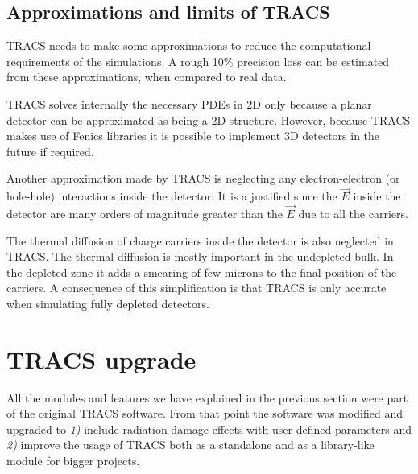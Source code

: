 \subsection{Approximations and limits of TRACS} %
\label{sec:approxTRACS}

TRACS needs to make some approximations to reduce the computational requirements of the simulations. A rough 10\% precision loss can be estimated from these approximations, when compared to real data. %
 
TRACS solves internally the necessary PDEs in 2D only because a planar detector can be approximated as being a 2D structure. However, because TRACS makes use of Fenics libraries it is possible to implement 3D detectors in the future if required.

Another approximation made by TRACS is neglecting any electron-electron (or hole-hole) interactions inside the detector. It is a justified since the $\overrightarrow E$ inside the detector are many orders of magnitude greater than the $\overrightarrow E$ due to all the carriers.

The thermal diffusion of charge carriers inside the detector is also neglected in TRACS. The thermal diffusion is mostly important in the undepleted bulk. In the depleted zone it adds a smearing of few microns to the final position of the carriers. A consequence of this simplification is that TRACS is only accurate when simulating fully depleted detectors. 

\section{TRACS upgrade} %
\label{sec:devTRACS}

All the modules and features we have explained in the previous section were part of the original TRACS software. From that point the software was modified and upgraded to \emph{1)} include radiation damage effects  with user defined parameters and \emph{2)} improve the usage of TRACS both as a standalone and as a library-like module for bigger projects.


